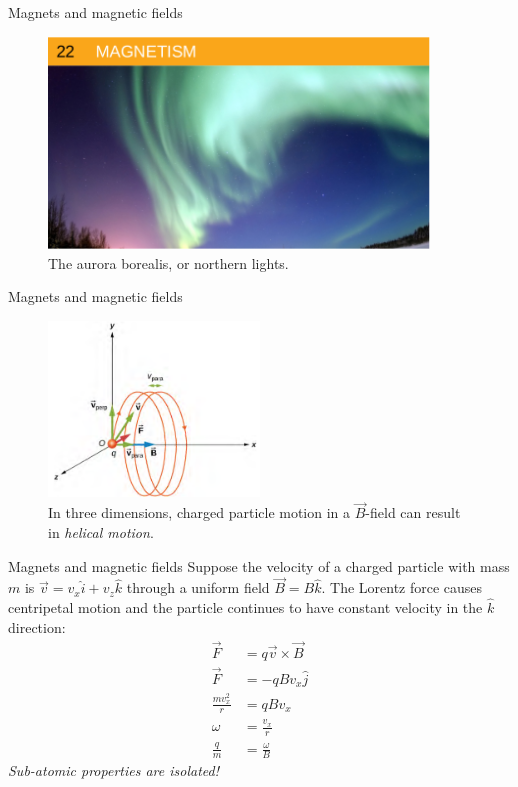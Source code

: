 \documentclass{beamer}
\begin{document}
\begin{frame}{Magnets and magnetic fields}
\begin{figure}
\centering
\includegraphics[width=0.9\textwidth]{figures/aurora.png}
\caption{\label{fig:aurora} The aurora borealis, or northern lights.}
\end{figure}
\end{frame}

\begin{frame}{Magnets and magnetic fields}
\begin{figure}
\centering
\includegraphics[width=0.5\textwidth]{figures/helix.png}
\caption{\label{fig:helix} In three dimensions, charged particle motion in a $\vec{B}$-field can result in \textit{helical motion}.}
\end{figure}
\end{frame}

\begin{frame}{Magnets and magnetic fields}
Suppose the velocity of a charged particle with mass $m$ is $\vec{v} = v_x \hat{i} + v_z \hat{k}$ through a uniform field $\vec{B} = B\hat{k}$.  The Lorentz force causes centripetal motion and the particle continues to have constant velocity in the $\hat{k}$ direction:
\begin{align}
\vec{F} &= q \vec{v} \times \vec{B} \\
\vec{F} &= -q B v_x \hat{j} \\
\frac{m v_x^2}{r} &= q B v_x \\
\omega &= \frac{v_x}{r} \\
\frac{q}{m} &= \frac{\omega}{B}
\end{align}
\textit{Sub-atomic properties are isolated!}
\end{frame}
\end{document}
